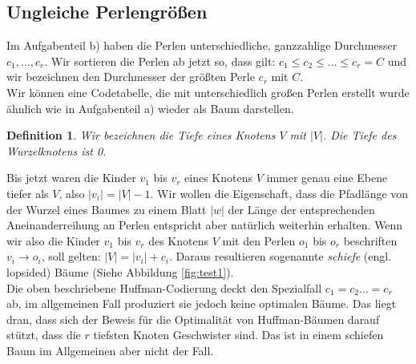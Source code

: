\documentclass[a4paper,10pt,ngerman]{scrartcl}
\newtheorem{definition}[satz]{Definition}
\begin{document}
    \subsection{Ungleiche Perlengrößen}
    Im Aufgabenteil b) haben die Perlen unterschiedliche, ganzzahlige Durchmesser $c_1, \dots, c_r$. Wir sortieren die Perlen ab jetzt so, dass gilt: $c_1 \le c_2 \le \dots \le c_r = C$ und wir bezeichnen den Durchmesser der größten Perle $c_r$ mit $C$. \\
    Wir können eine Codetabelle, die mit unterschiedlich großen Perlen erstellt wurde ähnlich wie in Aufgabenteil a) wieder als Baum darstellen.
    \begin{definition}
        Wir bezeichnen die Tiefe eines Knotens $V$ mit $|V|$. Die Tiefe des Wurzelknotens ist 0.
    \end{definition}
    Bis jetzt waren die Kinder $v_1$ bis $v_r$ eines Knotens $V$ immer genau eine Ebene tiefer als $V$, also $|v_i| = |V| - 1$.
    Wir wollen die Eigenschaft, dass die Pfadlänge von der Wurzel eines Baumes zu einem Blatt $|w|$ der Länge der entsprechenden Aneinanderreihung an Perlen entspricht aber natürlich weiterhin erhalten. Wenn wir also die Kinder $v_1$ bis $v_r$ des Knotens $V$ mit den Perlen $o_1$ bis $o_{r}$ beschriften $v_i \to o_i$, soll gelten: $|V| = |v_i| + c_i$.
    Daraus resultieren sogenannte \textit{schiefe} (engl. lopsided) Bäume (Siehe Abbildung \ref{fig:test1}). \\
    Die oben beschriebene Huffman-Codierung deckt den Spezialfall $c_1 = c_2 \dots = c_r$ ab, im allgemeinen Fall produziert sie jedoch keine optimalen Bäume.
    Das liegt dran, dass sich der Beweis für die Optimalität von Huffman-Bäumen darauf stützt, dass die $r$ tiefsten Knoten Geschwister sind.
    Das ist in einem schiefen Baum im Allgemeinen aber nicht der Fall.
\end{document}
